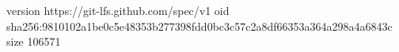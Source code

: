 version https://git-lfs.github.com/spec/v1
oid sha256:9810102a1be0c5e48353b277398fdd0bc3c57c2a8df66353a364a298a4a6843c
size 106571
